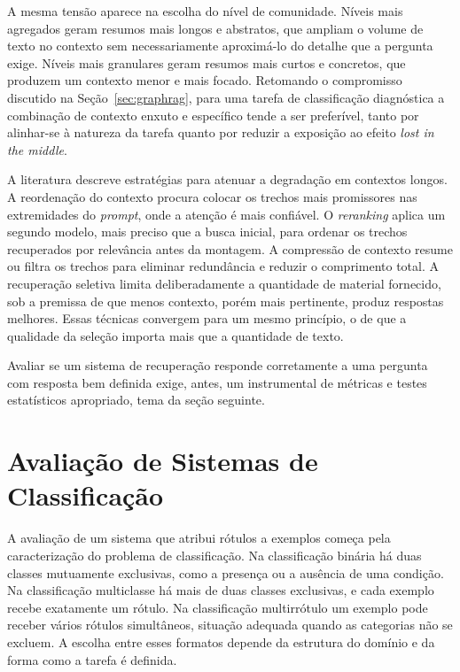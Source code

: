 A mesma tensão aparece na escolha do nível de comunidade. Níveis mais agregados geram resumos mais longos e abstratos, que ampliam o volume de texto no contexto sem necessariamente aproximá-lo do detalhe que a pergunta exige. Níveis mais granulares geram resumos mais curtos e concretos, que produzem um contexto menor e mais focado. Retomando o compromisso discutido na Seção~\ref{sec:graphrag}, para uma tarefa de classificação diagnóstica a combinação de contexto enxuto e específico tende a ser preferível, tanto por alinhar-se à natureza da tarefa quanto por reduzir a exposição ao efeito \textit{lost in the middle}.

A literatura descreve estratégias para atenuar a degradação em contextos longos. A reordenação do contexto procura colocar os trechos mais promissores nas extremidades do \textit{prompt}, onde a atenção é mais confiável. O \textit{reranking} aplica um segundo modelo, mais preciso que a busca inicial, para ordenar os trechos recuperados por relevância antes da montagem. A compressão de contexto resume ou filtra os trechos para eliminar redundância e reduzir o comprimento total. A recuperação seletiva limita deliberadamente a quantidade de material fornecido, sob a premissa de que menos contexto, porém mais pertinente, produz respostas melhores. Essas técnicas convergem para um mesmo princípio, o de que a qualidade da seleção importa mais que a quantidade de texto.

Avaliar se um sistema de recuperação responde corretamente a uma pergunta com resposta bem definida exige, antes, um instrumental de métricas e testes estatísticos apropriado, tema da seção seguinte.

\section{Avaliação de Sistemas de Classificação}\label{sec:avaliacao}

A avaliação de um sistema que atribui rótulos a exemplos começa pela caracterização do problema de classificação. Na classificação binária há duas classes mutuamente exclusivas, como a presença ou a ausência de uma condição. Na classificação multiclasse há mais de duas classes exclusivas, e cada exemplo recebe exatamente um rótulo. Na classificação multirrótulo um exemplo pode receber vários rótulos simultâneos, situação adequada quando as categorias não se excluem. A escolha entre esses formatos depende da estrutura do domínio e da forma como a tarefa é definida.

